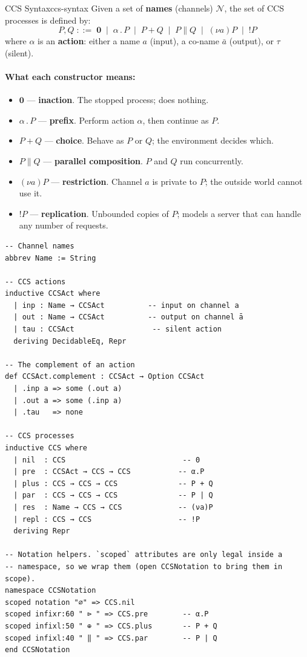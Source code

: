 \documentclass[11pt, a4paper, oneside]{book}
\newcommand{\nil}{\mathbf{0}}
\newcommand{\Par}{\mathbin{\|}}
\newcommand{\pref}{\mathbin{.}}
\newcommand{\res}[1]{(\nu #1)}
\newcommand{\repl}{\mathbin{!}}
\begin{document}
\begin{defn}{CCS Syntax}{ccs-syntax}
Given a set of \textbf{names} (channels) $\mathcal{N}$, the set of CCS
processes is defined by:
\[
  P, Q \;::=\;
    \nil
    \;\mid\; \alpha \pref P
    \;\mid\; P + Q
    \;\mid\; P \Par Q
    \;\mid\; \res{a} P
    \;\mid\; \repl P
\]
where $\alpha$ is an \textbf{action}: either a name $a$ (input), a co-name
$\bar{a}$ (output), or $\tau$ (silent).
\end{defn}

\paragraph{What each constructor means:}
\begin{itemize}[nosep]
\item $\nil$ --- \textbf{inaction}. The stopped process; does nothing.
\item $\alpha \pref P$ --- \textbf{prefix}. Perform action $\alpha$, then
  continue as $P$.
\item $P + Q$ --- \textbf{choice}. Behave as $P$ or $Q$; the environment
  decides which.
\item $P \Par Q$ --- \textbf{parallel composition}. $P$ and $Q$ run
  concurrently.
\item $\res{a} P$ --- \textbf{restriction}. Channel $a$ is private to $P$;
  the outside world cannot use it.
\item $\repl P$ --- \textbf{replication}. Unbounded copies of $P$;
  models a server that can handle any number of requests.
\end{itemize}

\begin{leanbox}
\begin{verbatim}
-- Channel names
abbrev Name := String

-- CCS actions
inductive CCSAct where
  | inp : Name → CCSAct          -- input on channel a
  | out : Name → CCSAct          -- output on channel ā
  | tau : CCSAct                  -- silent action
  deriving DecidableEq, Repr

-- The complement of an action
def CCSAct.complement : CCSAct → Option CCSAct
  | .inp a => some (.out a)
  | .out a => some (.inp a)
  | .tau   => none

-- CCS processes
inductive CCS where
  | nil  : CCS                           -- 0
  | pre  : CCSAct → CCS → CCS           -- α.P
  | plus : CCS → CCS → CCS              -- P + Q
  | par  : CCS → CCS → CCS              -- P | Q
  | res  : Name → CCS → CCS             -- (νa)P
  | repl : CCS → CCS                    -- !P
  deriving Repr

-- Notation helpers. `scoped` attributes are only legal inside a
-- namespace, so we wrap them (open CCSNotation to bring them in scope).
namespace CCSNotation
scoped notation "∅" => CCS.nil
scoped infixr:60 " ⊳ " => CCS.pre        -- α.P
scoped infixl:50 " ⊕ " => CCS.plus       -- P + Q
scoped infixl:40 " ‖ " => CCS.par        -- P | Q
end CCSNotation
\end{verbatim}
\end{leanbox}
\end{document}
